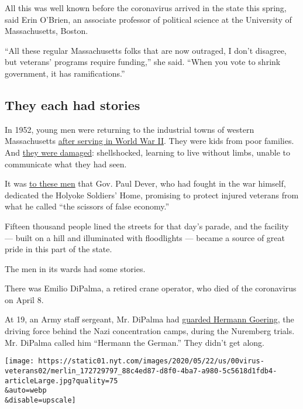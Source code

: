 All this was well known before the coronavirus arrived in the state this
spring, said Erin O'Brien, an associate professor of political science
at the University of Massachusetts, Boston.

``All these regular Massachusetts folks that are now outraged, I don't
disagree, but veterans' programs require funding,'' she said. ``When you
vote to shrink government, it has ramifications.''

\hypertarget{they-each-had-stories}{%
\subsection{They each had stories}\label{they-each-had-stories}}

In 1952, young men were returning to the industrial towns of western
Massachusetts
\href{https://www.bostonglobe.com/2020/04/01/metro/soldiers-homes-sprung-national-effort-care-wounded-aged-veterans/}{after
serving in World War II}. They were kids from poor families. And
\href{https://archives.lib.state.ma.us/bitstream/handle/2452/237911/ocm39986874-1949-SB-0575.pdf?sequence=1\&isAllowed=y}{they
were damaged}: shellshocked, learning to live without limbs, unable to
communicate what they had seen.

It was
\href{http://holyokemass.com/2010/04/27/dedication-of-soldiers-home-in-holyoke-attracts-15000/}{to
these men} that Gov. Paul Dever, who had fought in the war himself,
dedicated the Holyoke Soldiers' Home, promising to protect injured
veterans from what he called ``the scissors of false economy.''

Fifteen thousand people lined the streets for that day's parade, and the
facility --- built on a hill and illuminated with floodlights --- became
a source of great pride in this part of the state.

The men in its wards had some stories.

There was Emilio DiPalma, a retired crane operator, who died of the
coronavirus on April 8.

At 19, an Army staff sergeant, Mr. DiPalma had
\href{https://www.youtube.com/watch?v=CzlBPFDCNog}{guarded Hermann
Goering}, the driving force behind the Nazi concentration camps, during
the Nuremberg trials. Mr. DiPalma called him ``Hermann the German.''
They didn't get along.

\texttt{[image: https://static01.nyt.com/images/2020/05/22/us/00virus-veterans02/merlin\_172729797\_88c4ed87-d8f0-4ba7-a980-5c5618d1fdb4-articleLarge.jpg?quality=75\\\&auto=webp\\\&disable=upscale]}

